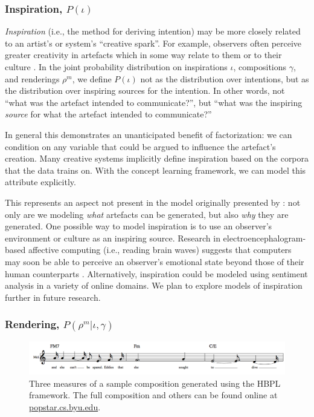 \documentclass[phd,electronic,oneside,twosidetoc,letterpaper,chaptercenter,parttop,lof,lot]{byumsphd}
\begin{document}
\subsubsection{Inspiration, $P(\iota)$}

\emph{Inspiration} (i.e., the method for deriving intention) may be more closely related to an artist's or system's ``creative spark''. For example, observers often perceive greater creativity in artefacts which in some way relate to them or to their culture \cite{colton2008creativity}. In the joint probability distribution on inspirations $\iota$, compositions $\gamma$, and renderings $\rho^{m}$, we define $P(\iota)$ not as the distribution over intentions, but as the distribution over inspiring sources for the intention. In other words, not ``what was the artefact intended to communicate?'', but ``what was the inspiring \emph{source} for what the artefact intended to communicate?''

In general this demonstrates an unanticipated benefit of factorization: we can condition on any variable that could be argued to influence the artefact's creation. Many creative systems implicitly define inspiration based on the corpora that the data trains on. With the concept learning framework, we can model this attribute explicitly.

This represents an aspect not present in the model originally presented by \citeauthor{Lake2015} \cite{Lake2015}: not only are we modeling \textit{what} artefacts can be generated, but also \textit{why} they are generated. One possible way to model inspiration is to use an observer's environment or culture as an inspiring source. Research in electroencephalogram-based affective computing (i.e., reading brain waves) suggests that computers may soon be able to perceive an observer's emotional state beyond those of their human counterparts \cite{volioti2016mapping}. Alternatively, inspiration could be modeled using sentiment analysis in a variety of online domains. We plan to explore models of inspiration further in future research.

\subsubsection{Rendering, $P(\rho^{m}|\iota,\gamma)$}

\begin{figure}
	\centering
	\includegraphics[width=\linewidth]{example}
	\caption{\label{fig:example_composition} Three measures of a sample composition generated using the HBPL framework. The full composition and others can be found online at \url{popstar.cs.byu.edu}.}
\end{figure}
\end{document}
